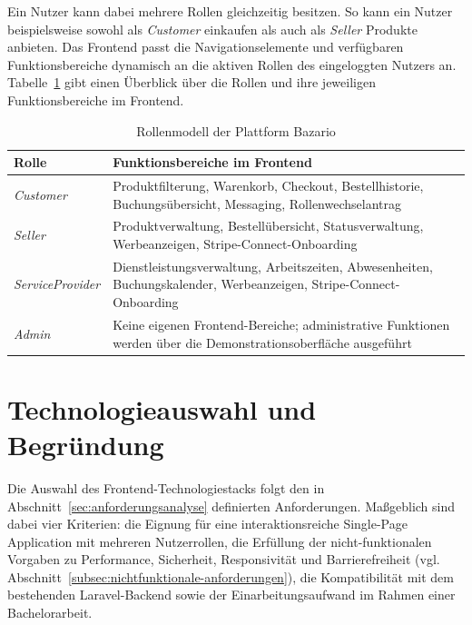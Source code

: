 Ein Nutzer kann dabei mehrere Rollen gleichzeitig
besitzen. So kann ein Nutzer beispielsweise sowohl als
\textit{Customer} einkaufen als auch als \textit{Seller} Produkte anbieten.
Das Frontend passt die Navigationselemente und verfügbaren
Funktionsbereiche dynamisch an die aktiven Rollen des
eingeloggten Nutzers an. Tabelle~\ref{tab:rollenmodell}
gibt einen Überblick über die Rollen und ihre jeweiligen
Funktionsbereiche im Frontend.

\begin{table}[htbp]
\centering
\caption{Rollenmodell der Plattform Bazario}
\label{tab:rollenmodell}
\begin{tabular}{|p{3cm}|p{9.5cm}|}
\hline
\textbf{Rolle} & \textbf{Funktionsbereiche im Frontend} \\
\hline
\textit{Customer} & Produktfilterung, Warenkorb, Checkout,
Bestellhistorie, Buchungsübersicht, Messaging,
Rollenwechselantrag \\
\hline
\textit{Seller} & Produktverwaltung, Bestellübersicht,
Statusverwaltung, Werbeanzeigen,
Stripe-Connect-Onboarding \\
\hline
\textit{ServiceProvider} & Dienstleistungsverwaltung, Arbeitszeiten,
Abwesenheiten, Buchungskalender, Werbeanzeigen,
Stripe-Connect-Onboarding \\
\hline
\textit{Admin} & Keine eigenen Frontend-Bereiche; administrative Funktionen werden über die Demonstrationsoberfläche ausgeführt \\
\hline
\end{tabular}
\end{table}

\section{Technologieauswahl und Begründung}
\label{sec:technologieauswahl}

Die Auswahl des Frontend-Technologiestacks folgt den in
Abschnitt~\ref{sec:anforderungsanalyse} definierten Anforderungen.
Maßgeblich sind dabei vier Kriterien: die Eignung für eine
interaktionsreiche Single-Page Application mit mehreren
Nutzerrollen, die Erfüllung der nicht-funktionalen Vorgaben zu
Performance, Sicherheit, Responsivität und Barrierefreiheit
(vgl. Abschnitt~\ref{subsec:nichtfunktionale-anforderungen}), die
Kompatibilität mit dem bestehenden Laravel-Backend sowie der
Einarbeitungsaufwand im Rahmen einer Bachelorarbeit.


